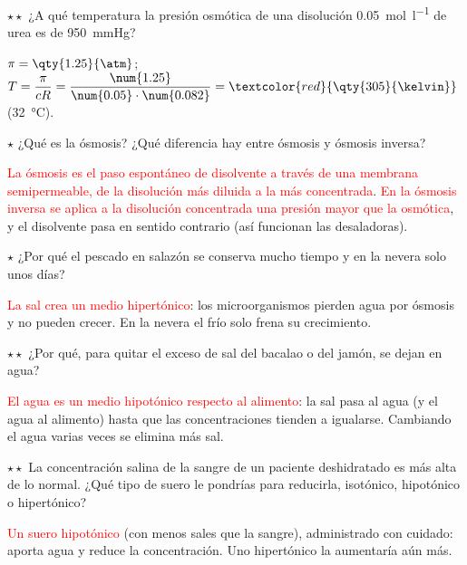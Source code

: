 \begin{exercise}
    \(\star\star\) ¿A qué temperatura la presión osmótica de una disolución \qty{0.05}{\mol\per\litre} de urea es de
    \qty{950}{\mmHg}?
    \begin{solu}
        \(\pi = \qty{1.25}{\atm}\); \(T = \dfrac{\pi}{c R} = \dfrac{\num{1.25}}{\num{0.05} \cdot \num{0.082}} = \textcolor{red}{\qty{305}{\kelvin}}\) (\qty{32}{\degreeCelsius}).
    \end{solu}
\end{exercise}

\begin{exercise}
    \(\star\) ¿Qué es la ósmosis? ¿Qué diferencia hay entre ósmosis y ósmosis inversa?
    \begin{solu}
        \textcolor{red}{La ósmosis es el paso espontáneo de disolvente a través de una membrana semipermeable, de la disolución más
        diluida a la más concentrada}. \textcolor{red}{En la ósmosis inversa se aplica a la disolución concentrada una presión mayor
        que la osmótica}, y el disolvente pasa en sentido contrario (así funcionan las desaladoras).
    \end{solu}
\end{exercise}

\begin{exercise}
    \(\star\) ¿Por qué el pescado en salazón se conserva mucho tiempo y en la nevera solo unos días?
    \begin{solu}
        \textcolor{red}{La sal crea un medio hipertónico}: los microorganismos pierden agua por ósmosis y no pueden crecer. En la
        nevera el frío solo frena su crecimiento.
    \end{solu}
\end{exercise}

\begin{exercise}
    \(\star\star\) ¿Por qué, para quitar el exceso de sal del bacalao o del jamón, se dejan en agua?
    \begin{solu}
        \textcolor{red}{El agua es un medio hipotónico respecto al alimento}: la sal pasa al agua (y el agua al alimento) hasta que
        las concentraciones tienden a igualarse. Cambiando el agua varias veces se elimina más sal.
    \end{solu}
\end{exercise}

\begin{exercise}
    \(\star\star\) La concentración salina de la sangre de un paciente deshidratado es más alta de lo normal. ¿Qué tipo de suero
    le pondrías para reducirla, isotónico, hipotónico o hipertónico?
    \begin{solu}
        \textcolor{red}{Un suero hipotónico} (con menos sales que la sangre), administrado con cuidado: aporta agua y reduce la
        concentración. Uno hipertónico la aumentaría aún más.
    \end{solu}
\end{exercise}

